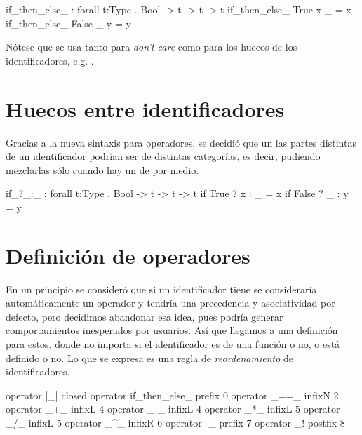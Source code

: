 {\begin{designfr}
\begin{anglercode}
if_then_else_ : forall t:Type . Bool -> t -> t -> t
if_then_else_ True  x _ = x
if_then_else_ False _ y = y
\end{anglercode}

Nótese que se usa \inlinecode{\_} tanto para \emph{don't care} como para los huecos de los identificadores, e.g. .
\end{designfr}

\section{Huecos entre identificadores}

\begin{designfr}
Gracias a la nueva sintaxis para operadores, se decidió que un las partes distintas de un identificador podrían ser de distintas categorías, es decir, pudiendo mezclarlas sólo cuando hay un \inlinecode{\_} de por medio.

\begin{anglercode}
if_?_:_ : forall t:Type . Bool -> t -> t -> t
if True  ? x : _ = x
if False ? _ : y = y
\end{anglercode}
\end{designfr}

\section{Definición de operadores}

\begin{designfr}
En un principio se consideró que si un identificador tiene \inlinecode{\_} se consideraría automáticamente un operador y tendría una precedencia y asociatividad por defecto, pero decidimos abandonar esa idea, pues podría generar comportamientos inesperados por usuarios. Así que llegamos a una definición para estos, donde no importa si el identificador es de una función o no, o está definido o no. Lo que se expresa es una regla de \emph{reordenamiento} de identificadores.

\begin{anglercode}[label=lst:operatorsdefinition]
operator |_|                closed
operator if_then_else_      prefix  0
operator _==_               infixN  2
operator _+_                infixL  4
operator _-_                infixL  4
operator _*_                infixL  5
operator _/_                infixL  5
operator _^_                infixR  6
operator -_                 prefix  7
operator _!                 postfix 8


\end{anglercode}
\end{designfr}}
